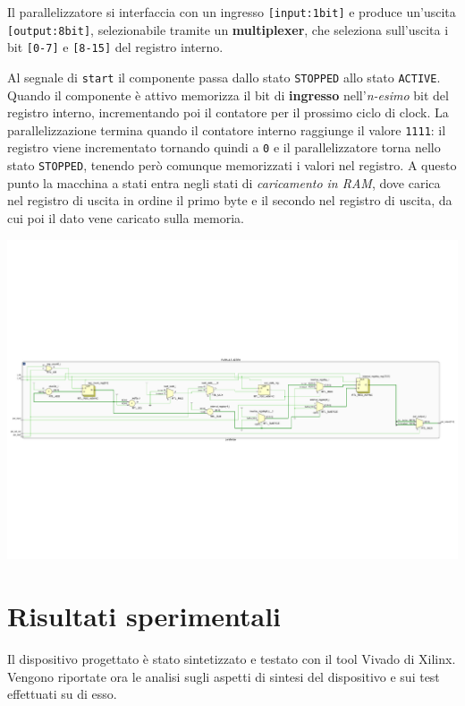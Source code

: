 \documentclass[a4paper]{report}
\begin{document}
Il parallelizzatore si interfaccia con un ingresso \texttt{[input:1bit]} e produce un'uscita \texttt{[output:8bit]}, selezionabile tramite un \textbf{multiplexer}, che seleziona sull'uscita i bit \texttt{[0-7]} e \texttt{[8-15]} del registro interno.

Al segnale di \texttt{start} il componente passa dallo stato \texttt{STOPPED} allo stato \texttt{ACTIVE}. Quando il componente è attivo memorizza il bit di \textbf{ingresso} nell'\textit{n-esimo} bit del registro interno, incrementando poi il contatore per il prossimo ciclo di clock. La parallelizzazione termina quando il contatore interno raggiunge il valore \texttt{1111}: il registro viene incrementato tornando quindi a \texttt{0} e il parallelizzatore torna nello stato \texttt{STOPPED}, tenendo però comunque memorizzati i valori nel registro. A questo punto la macchina a stati entra negli stati di \textit{caricamento in RAM}, dove carica nel registro di uscita in ordine il primo byte e il secondo nel registro di uscita, da cui poi il dato vene caricato sulla memoria.

\includegraphics[scale = 0.45]{schematics/parallelizer.pdf}



\chapter{Risultati sperimentali}
Il dispositivo progettato è stato sintetizzato e testato con il tool Vivado di Xilinx. Vengono riportate ora le analisi sugli aspetti di sintesi del dispositivo e sui test effettuati su di esso.
\end{document}
